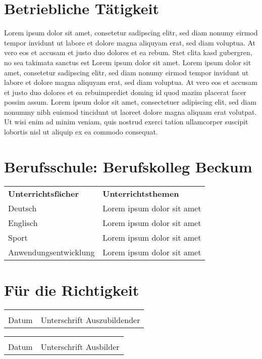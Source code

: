 \documentclass[11pt,a4paper]{article}
\author{Gustav Tester} %
\begin{document}
\section*{Betriebliche Tätigkeit} %
Lorem ipsum dolor sit amet, consetetur sadipscing elitr, sed diam nonumy eirmod tempor invidunt ut labore et dolore magna aliquyam erat, sed diam voluptua. At vero eos et accusam et justo duo dolores et ea rebum. Stet clita kasd gubergren, no sea takimata sanctus est Lorem ipsum dolor sit amet. Lorem ipsum dolor sit amet, consetetur sadipscing elitr, sed diam nonumy eirmod tempor invidunt ut labore et dolore magna aliquyam erat, sed diam voluptua. At vero eos et accusam et justo duo dolores et ea rebuimperdiet doming id quod mazim placerat facer possim assum. Lorem ipsum dolor sit amet, consectetuer adipiscing elit, sed diam nonummy nibh euismod tincidunt ut laoreet dolore magna aliquam erat volutpat. Ut wisi enim ad minim veniam, quis nostrud exerci tation ullamcorper suscipit lobortis nisl ut aliquip ex ea commodo consequat.


\section*{Berufsschule: Berufskolleg Beckum}
\vspace{.3cm}

\begin{tabular}{@{}p{5.3cm}p{12cm}@{}}
	\textbf{Unterrichtsfächer} & \textbf{Unterrichtsthemen}\\
	Deutsch & Lorem ipsum dolor sit amet\\
	Englisch & Lorem ipsum dolor sit amet\\
	Sport & Lorem ipsum dolor sit amet\\
	Anwendungsentwicklung & Lorem ipsum dolor sit amet\\
\end{tabular}
\vspace{.3cm}

\vfill
\section*{Für die Richtigkeit}
\vspace{.5cm}
\begin{multicols}{2}
	\begin{tabular}{@{}p{2cm}p{5cm}@{}}
		\hrulefill & \hrulefill\\
		Datum & Unterschrift Auszubildender
	\end{tabular}
	\vfill\null
	\columnbreak
	\begin{tabular}{@{}p{2cm}p{5cm}@{}}
		\hrulefill & \hrulefill\\
		Datum & Unterschrift Ausbilder
	\end{tabular}
\end{multicols}
\end{document}
